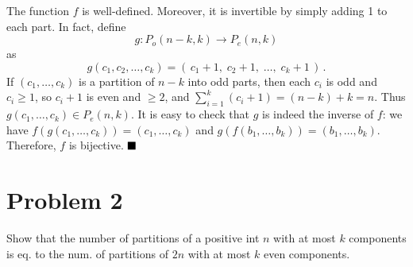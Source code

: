 \documentclass[docmute]{article}
\begin{document}
\begin{itemize}
  The function $f$ is well-defined. Moreover, it is invertible by simply adding 1 to each part. In fact, define 
  \[
    g: P_o(n-k,k) \to P_e(n,k)
  \] 
  as 
  \[
    g(c_1,c_2,\ldots,c_k) = (\,c_1 + 1,\; c_2 + 1,\; \ldots,\; c_k + 1\,)\,. 
  \] 
  If $(c_1,\ldots,c_k)$ is a partition of $n-k$ into odd parts, then each $c_i$ is odd and $c_i \ge 1$, so $c_i + 1$ is even and $\ge 2$, and $\sum_{i=1}^k (c_i + 1) = (n-k) + k = n$. Thus $g(c_1,\ldots,c_k) \in P_e(n,k)$. It is easy to check that $g$ is indeed the inverse of $f$: we have $f(g(c_1,\ldots,c_k)) = (c_1,\ldots,c_k)$ and $g(f(b_1,\ldots,b_k)) = (b_1,\ldots,b_k)$. Therefore, $f$ is bijective. $\hfill\blacksquare$ %
\end{itemize}

\vspace{1em} %

\section{Problem 2} Show that the number of partitions of a positive int $n$ with at most $k$ components is eq. to the num. of partitions of $2n$ with at most $k$ even components.
\end{document}
